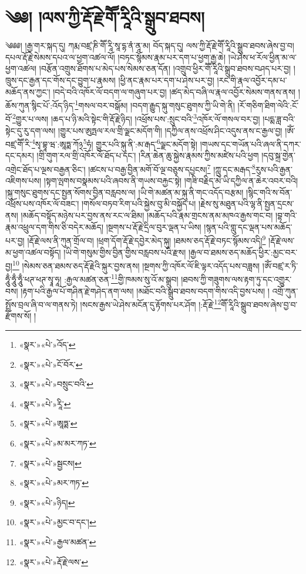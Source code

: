 \chapter{༄༅། །ལས་ཀྱི་རྡོ་རྗེ་གཽ་རཱིའི་སྒྲུབ་ཐབས།}༄༅༅། །རྒྱ་གར་སྐད་དུ། ཀརྨ་བཛྲ་ཎི་གཽ་རཱི་སཱ་དྷ་ནཾ་ནཱ་མ། བོད་སྐད་དུ། ལས་ཀྱི་རྡོ་རྗེ་གཽ་རཱིའི་སྒྲུབ་ཐབས་ཞེས་བྱ་བ། དཔལ་རྡོ་རྗེ་སེམས་དཔའ་ལ་ཕྱག་འཚལ་ལོ། །བཏང་སྙོམས་རྣམ་པར་དག་པ་ཕྱག་རྒྱ་ཆེ། །ཡེ་ཤེས་ཕ་རོལ་ཕྱིན་མ་ལ་ཕྱག་འཚལ། །བརྩོན་འགྲུས་ཐོགས་པ་མེད་པས་སེམས་ཅན་དོན། །འགྲུབ་ཕྱིར་གཽ་རཱིའི་སྒྲུབ་ཐབས་བཤད་པར་བྱ། །ཁྲུས་དང་རྒྱན་དང་གོས་དང་བྱུག་པ་རྣམས། །ཕྱི་ནང་རྣམ་པར་དག་པ་ཤེས་པར་བྱ། །རང་གི་རྣལ་འབྱོར་དམ་པ་མཆོད་ནས་ཀྱང་། །བདེ་བའི་འཁོར་ལོ་བདག་ལ་གཞུག་པར་བྱ། །ཚད་མེད་བཞི་ལ་རྣལ་འབྱོར་སེམས་གནས་ནས། །ཆོས་ཀུན་སྙིང་པོ་:འོད་ཉིད་\footnote{«སྣར་»«པེ་»འོད་}གསལ་བར་བསྒོམ། །བདག་རྒྱུད་སྐུ་གསུང་ཐུགས་ཀྱི་ཡི་གེ་ནི། །རོ་གཅིག་ཐིག་ལེའི་:ངོ་བོ་\footnote{«སྣར་»«པེ་»ངོ་བོར་}གྱུར་པ་ལས། །ཆད་པ་ཉི་མའི་སྟེང་གི་རྡོ་རྗེ་ཉིད། །འཕྲོས་པས་:སྲུང་བའི་\footnote{«སྣར་»«པེ་»བསྲུང་བའི་}འཁོར་ལོ་གསལ་བར་བྱ། །པདྨ་ཟླ་བའི་སྟེང་དུ་རུ་དག་ལས། །གྱུར་པས་ཨུཏྤལ་རལ་གྲི་ལྗང་མདོག་གི། །དཀྱིལ་ནས་འཕྲོས་ཤིང་འདུས་ནས་ང་རྒྱལ་བྱ། །ཨོཾ་བཛྲ་གཽ་རི་\footnote{«སྣར་»«པེ་»རཱི་}སྭ་བྷཱ་ཝ་:ཨཱཏྨ་ཀོ྅\footnote{«སྣར་»«པེ་»ཨཱཏྨ་}ཧཾ། གྱུར་པའི་སྐུ་ནི་:མ་རྒད་\footnote{«སྣར་»«པེ་»མ་མར་ཀཏ་}ལྗང་མདོག་སྟེ། །གཡས་དང་གཡོན་པའི་ཞལ་ནི་དཀར་དང་དམར། །གྲི་གུག་རལ་གྲི་འཁོར་ལོ་ཐོད་པ་དང་། །རིན་ཆེན་ཆུ་སྐྱེས་རྣམས་ཀྱིས་མཛེས་པའི་ཕྱག །དབུ་སྐྲ་གྱེན་འགྲེང་ཐོད་པ་ལྔས་བརྒྱན་ཅིང་། །ཚངས་པ་བརྒྱ་བྱིན་མགོ་བོ་ལྔ་བཅུས་དཔྱངས།\footnote{«སྣར་»«པེ་»སྦྱངས།} །ཀླུ་དང་མརྒད་\footnote{«སྣར་»«པེ་»མར་ཀཏ་}རུས་པའི་རྒྱན་འཇིགས་པས། །སྟག་ལྤགས་བསྣམས་པའི་ཞབས་ནི་གཡས་བརྐྱང་སྟེ། །གཟི་བརྗིད་མེ་ཡི་དཀྱིལ་ན་ཆེར་འབར་བའི། །སྐུ་གསུང་ཐུགས་དང་སྤྱན་སོགས་བྱིན་བརླབས་ལ། །ཡི་གེ་མཚན་མ་སྐུ་ནི་གང་འདོད་བརྩམ། །སྙིང་གའི་ས་བོན་འཕྲོས་པས་འཁོར་ལོ་བཟང་། །གསོལ་བཏབ་རིག་པའི་སྐྱེས་བུ་མི་བསྐྱོད་པ། །རྗེས་སུ་མཐུན་པའི་ལྷ་ནི་སྤྱན་དྲངས་ནས། །མཆོད་བསྟོད་མཉེས་པར་བྱས་ནས་རང་ལ་ཐིམ། །མཆོད་པའི་རྣམ་གྲངས་ནམ་མཁའ་རྒྱས་གང་བ། །བྷ་གའི་རྣམ་འཕྲུལ་དག་གིས་ཅི་བདེར་མཆོད། །སྔགས་པ་རྡོ་རྗེ་དྲིལ་བུར་ལྡན་པ་ཡིས། །སྙན་པའི་གླུ་དང་ལྡན་པས་མཆོད་པར་བྱ། །རྡོ་རྗེ་ལས་ནི་ཀུན་གྲོལ་བ། །ཕྲག་དོག་རྡོ་རྗེ་དབྱེར་མེད་སྐུ། །ཐམས་ཅད་རྡོ་རྗེ་བཏང་སྙོམས་འདི།\footnote{«སྣར་»«པེ་»ཉིད།} །རྡོ་རྗེ་ལས་མ་ཕྱག་འཚལ་བསྟོད། །ཡི་གེ་གསུམ་གྱིས་བྱིན་གྱིས་བརླབས་པའི་རྫས། །རྒྱལ་བ་ཐམས་ཅད་མཆོད་ཕྱིར་:མྱང་བར་བྱ།\footnote{«སྣར་»«པེ་»མྱང་བ་དང་།} །སེམས་ཅན་ཐམས་ཅད་རྡོ་རྗེའི་སྐུར་བྱས་ནས། །སྔགས་ཀྱི་འཁོར་ལོ་ཇི་ལྟར་འདོད་པས་བཟླས། །ཨོཾ་བཛྲ་ར་ཏི་ཧཱུྃ་ཧཱུྃ་ཧཱུྃ་ཕཊ་ཕཊ་སྭཱ་ཧཱ། :རྒྱལ་མཚན་ཅན་\footnote{«སྣར་»«པེ་»རྒྱལ་མཚན་}གྱི་ཁམས་སུ་འོ་མ་སྒྲུབ། །ཐབས་ཀྱི་གཟུགས་ལས་རྟག་ཏུ་དང་འགྱུར་བས། །རྟག་པའི་རྒྱལ་པོ་གཤིན་རྗེ་གཤེད་ནག་ལས། །མཐོང་བའི་སྒྲུབ་ཐབས་བདག་གིས་འདི་བྱས་པས། །
འགྲོ་ཀུན་སྤྲོས་བྲལ་ཞི་བ་ལ་གནས་ཏེ། །སངས་རྒྱས་ཡེ་ཤེས་མངོན་དུ་རྟོགས་པར་ཤོག །:རྡོ་རྗེ་\footnote{«སྣར་»«པེ་»རྡོ་རྗེ་ལས་}གཽ་རཱིའི་སྒྲུབ་ཐབས་ཞེས་བྱ་བ་རྫོགས་སོ། ། 
